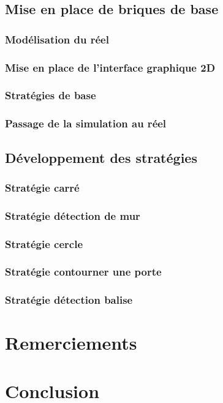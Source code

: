 \documentclass[12pt]{article}
\begin{document}
\newpage
\subsection{Mise en place de briques de base}
\subsubsection{Modélisation du réel}
\subsubsection{Mise en place de l'interface graphique 2D}
\subsubsection{Stratégies de base}
\subsubsection{Passage de la simulation au réel}

\newpage
\subsection{Développement des stratégies}
\subsubsection{Stratégie carré}
\subsubsection{Stratégie détection de mur}
\subsubsection{Stratégie cercle}
\subsubsection{Stratégie contourner une porte}
\subsubsection{Stratégie détection balise}

\newpage

\section{Remerciements}

\newpage

\section{Conclusion}
\end{document}
